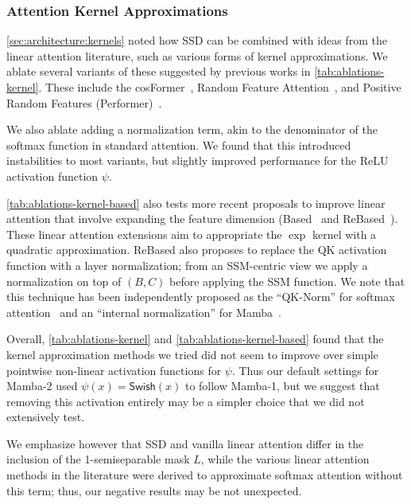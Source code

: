 \documentclass{article}
\newcommand{\citep}{\parencite}
\begin{document}
{\subsubsection{Attention Kernel Approximations}
\label{sec:experiments:ablations:kernels}

\cref{sec:architecture:kernels} noted how SSD can be combined with ideas from the linear attention literature,
such as various forms of kernel approximations.
We ablate several variants of these suggested by previous works in \cref{tab:ablations-kernel}.
These include the cosFormer~\citep{qin2022cosformer}, Random Feature Attention~\cite{peng2021random}, and Positive Random Features (Performer)~\citep{choromanski2021rethinking}.

We also ablate adding a normalization term, akin to the denominator of the softmax function in standard attention.
We found that this introduced instabilities to most variants, but slightly improved performance for the ReLU activation function $\psi$.

\cref{tab:ablations-kernel-based} also tests more recent proposals to improve linear attention that involve expanding the feature dimension (Based~\citep{arora2024simple} and ReBased~\citep{aksenov2024linear}).
These linear attention extensions aim to appropriate the $\exp$ kernel with a quadratic approximation.
ReBased also proposes to replace the QK activation function with a layer normalization;
from an SSM-centric view we apply a normalization on top of $(B, C)$ before applying the SSM function.
We note that this technique has been independently proposed as the ``QK-Norm'' for softmax attention~\citep{team2024chameleon}
and an ``internal normalization'' for Mamba~\citep{lieber2024jamba}.

Overall, \cref{tab:ablations-kernel} and \cref{tab:ablations-kernel-based} found that the kernel approximation methods we tried did not seem to improve over simple pointwise non-linear activation functions for $\psi$.
Thus our default settings for Mamba-2 used $\psi(x) = \mathsf{Swish}(x)$ to follow Mamba-1,
but we suggest that removing this activation entirely may be a simpler choice that we did not extensively test.

We emphasize however that SSD and vanilla linear attention differ in the inclusion of the 1-semiseparable mask $L$, while the various linear attention methods in the literature were derived to approximate softmax attention without this term; thus, our negative results may be not unexpected.

}
\end{document}
